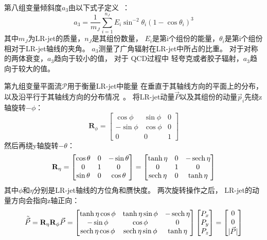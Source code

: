 第八组变量倾斜度$a_3$由以下式子定义~\cite{JSS13,JSA3}：
\begin{equation} 
\label{eq:JSS7}
a_3=\frac{1}{m_J} \sum_{i=1}^{n_J} E_i \sin^{-2} \theta_i (1-\cos \theta_i)^3
\end{equation}
其中$m_J$为LR-jet的质量，$n_J$是其组份数量，
$E_i$是第i个组份的能量，$\theta_i$是第i个组份相对于LR-jet轴线的夹角。
$a_3$测量了广角辐射在LR-jet中所占的比重。
对于对称的两体衰变，$a_3$趋向于较小的值，
对于
QCD过程中
轻夸克或者胶子辐射，$a_3$趋向于较大的值。

第九组变量平面流$\mathcal{P}$用于衡量LR-jet中能量
在垂直于其轴线方向的平面上的分布，
以及沿平行于其轴线方向的分布情况~\cite{JSS11}。
将LR-jet动量$\vec{P}$以及其组份的动量$\vec{p}_i$先绕z轴旋转$-\phi$：
\begin{equation} 
\label{eq:JSS8}
\mathbf{R}_{\phi}=
\begin{bmatrix}
\cos \phi & \sin\phi & 0\\
-\sin\phi & \cos\phi & 0\\
 0&0&1
\end{bmatrix}
\end{equation}
然后再绕y轴旋转$-\theta$：
\begin{equation} 
\label{eq:JSS9}
\mathbf{R}_{\eta}=
\begin{bmatrix}
\cos \theta & 0 & -\sin\theta\\
0 & 1 & 0\\
 \sin\theta&0& \cos\theta
\end{bmatrix}
=
\begin{bmatrix}
\tanh\eta & 0 & -\operatorname{sech}\eta\\
0 & 1 & 0\\
 \operatorname{sech}\eta&0& \tanh\eta
\end{bmatrix}
\end{equation}
其中$\phi$和$\eta$分别是LR-jet轴线的方位角和赝快度。
两次旋转操作之后，%
LR-jet的动量方向会指向z轴正向：
\begin{equation} 
\label{eq:JSS10}
\tilde{\vec{P}}=\mathbf{R}_{\eta}\mathbf{R}_{\phi}\vec{P}=
\begin{bmatrix}
\tanh\eta\cos \phi & \tanh\eta\sin\phi & -\operatorname{sech}\eta\\
-\sin\phi & \cos\phi & 0\\
  \operatorname{sech}\eta\cos\phi &\operatorname{sech}\eta\sin\phi & \tanh\eta
\end{bmatrix}
\begin{bmatrix}
P_x \\
P_y \\
P_z
\end{bmatrix}
=
\begin{bmatrix}
0 \\
0 \\
|\vec{P}|
\end{bmatrix}
\end{equation}
